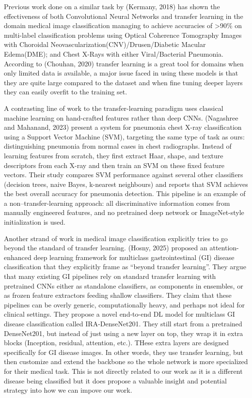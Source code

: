 \documentclass[11pt]{article}
\begin{document}
Previous work done on a similar task by (Kermany, 2018) has shown the effectiveness of both Convolutional Neural Networks and transfer learning in the domain medical image classification managing to achieve accuracies of >90\% on multi-label classification problems using Optical Coherence Tomography Images with Choroidal Neovascularization(CNV)/Drusen/Diabetic Macular Edema(DME); and Chest X-Rays with either Viral/Bacterial Pneumonia.  According to (Chouhan, 2020) transfer learning is a great tool for domains when only limited data is available, a major issue faced in using these models is that they are quite large compared to the dataset and when fine tuning deeper layers they can easily overfit to the training set. 


A contrasting line of work to the transfer-learning paradigm uses classical machine learning on hand-crafted features rather than deep CNNs. (Nagashree and Mahanand, 2023) present a system for pneumonia chest X-ray classification using a Support Vector Machine (SVM), targeting the same type of task as ours: distinguishing pneumonia from normal cases in chest radiographs. Instead of learning features from scratch, they first extract Haar, shape, and texture descriptors from each X-ray and then train an SVM on these fixed feature vectors. Their study compares SVM performance against several other classifiers (decision trees, naive Bayes, k-nearest neighbours) and reports that SVM achieves the best overall accuracy for pneumonia detection. This pipeline is an example of a non–transfer-learning approach: all discriminative information comes from manually engineered features, and no pretrained deep network or ImageNet-style initialization is used.

Another strand of work in medical image classification explicitly tries to go beyond the standard of transfer learning. (Hosny, 2025) proposed an attention-enhanced deep learning framework for multiclass gastrointestinal (GI) disease classification that they explicitly frame as “beyond transfer learning”. They argue that many existing GI pipelines rely on standard transfer learning with pretrained CNNs either as standalone classifiers, as components in ensembles, or as frozen feature extractors feeding shallow classifiers. They claim that these pipelines can be overly generic, computationally heavy, and perhaps not ideal for clinical settings. They propose a novel end-to-end DL model for multiclass GI disease classification called IRA-DenseNet201. They still start from a pretrained DenseNet201, but instead of just using a new layer on top, they wrap it in extra blocks (Inception, residual, attention, etc.). THese extra layers are designed specifically for GI disease images. In other words, they use transfer learning, but then customize and extend the backbone so the whole network is more specialized for their medical task. This is not directly related to our work as it is a different disease being classified but it does propose a valuable insight and potential strategy into how we can impove our work.
\end{document}
